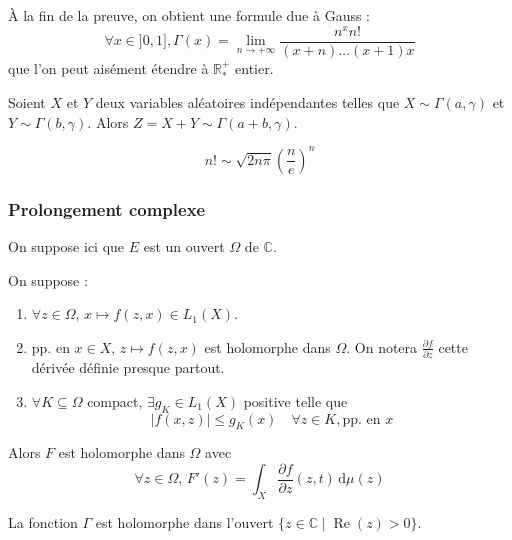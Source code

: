 	\begin{remark}
		À la fin de la preuve, on obtient une formule due à Gauss :
		\[ \forall x \in ]0, 1], \Gamma(x) = \lim_{n \rightarrow +\infty} \frac{n^x n!}{(x+n) \dots (x+1)x} \]
		que l'on peut aisément étendre à $\mathbb{R}^+_*$ entier.
	\end{remark}


	\begin{lemma}
		Soient $X$ et $Y$ deux variables aléatoires indépendantes telles que $X \sim \Gamma(a, \gamma)$ et $Y \sim \Gamma(b, \gamma)$. Alors $Z = X + Y \sim \Gamma(a+b, \gamma)$.
	\end{lemma}


	\begin{application}
		\[ n! \sim \sqrt{2n\pi} \left(\frac{n}{e} \right)^n \]
	\end{application}

	\subsubsection{Prolongement complexe}


	On suppose ici que $E$ est un ouvert $\Omega$ de $\mathbb{C}$.

	\begin{theorem}
		On suppose :
		\begin{enumerate}[label=(\roman*)]
			\item $\forall z \in \Omega$, $x \mapsto f(z,x) \in L_1(X)$.
			\item pp. en $x \in X$, $z \mapsto f(z,x)$ est holomorphe dans $\Omega$. On notera $\frac{\partial f}{\partial z}$ cette dérivée définie presque partout.
			\item $\forall K \subseteq \Omega$ compact, $\exists g_K \in L_1(X)$ positive telle que
			\[ \left| f(x,z) \right| \leq g_K(x) \quad \forall z \in K, \text{pp. en } x \]
		\end{enumerate}
		Alors $F$ est holomorphe dans $\Omega$ avec
		\[ \forall z \in \Omega, \, F'(z) = \int_X \frac{\partial f}{\partial z}(z, t) \, \mathrm{d}\mu(z) \]
	\end{theorem}


	\begin{example}
		La fonction $\Gamma$ est holomorphe dans l'ouvert $\{ z \in \mathbb{C} \mid \operatorname{Re}(z) > 0 \}$.
	\end{example}

